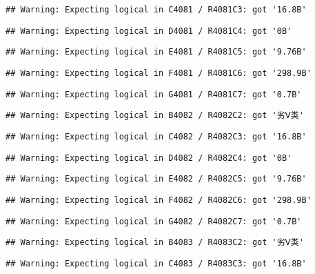 \documentclass[
]{article}
\begin{document}
\begin{verbatim}
## Warning: Expecting logical in C4081 / R4081C3: got '16.8B'
\end{verbatim}

\begin{verbatim}
## Warning: Expecting logical in D4081 / R4081C4: got '0B'
\end{verbatim}

\begin{verbatim}
## Warning: Expecting logical in E4081 / R4081C5: got '9.76B'
\end{verbatim}

\begin{verbatim}
## Warning: Expecting logical in F4081 / R4081C6: got '298.9B'
\end{verbatim}

\begin{verbatim}
## Warning: Expecting logical in G4081 / R4081C7: got '0.7B'
\end{verbatim}

\begin{verbatim}
## Warning: Expecting logical in B4082 / R4082C2: got '劣Ⅴ类'
\end{verbatim}

\begin{verbatim}
## Warning: Expecting logical in C4082 / R4082C3: got '16.8B'
\end{verbatim}

\begin{verbatim}
## Warning: Expecting logical in D4082 / R4082C4: got '0B'
\end{verbatim}

\begin{verbatim}
## Warning: Expecting logical in E4082 / R4082C5: got '9.76B'
\end{verbatim}

\begin{verbatim}
## Warning: Expecting logical in F4082 / R4082C6: got '298.9B'
\end{verbatim}

\begin{verbatim}
## Warning: Expecting logical in G4082 / R4082C7: got '0.7B'
\end{verbatim}

\begin{verbatim}
## Warning: Expecting logical in B4083 / R4083C2: got '劣Ⅴ类'
\end{verbatim}

\begin{verbatim}
## Warning: Expecting logical in C4083 / R4083C3: got '16.8B'
\end{verbatim}
\end{document}

